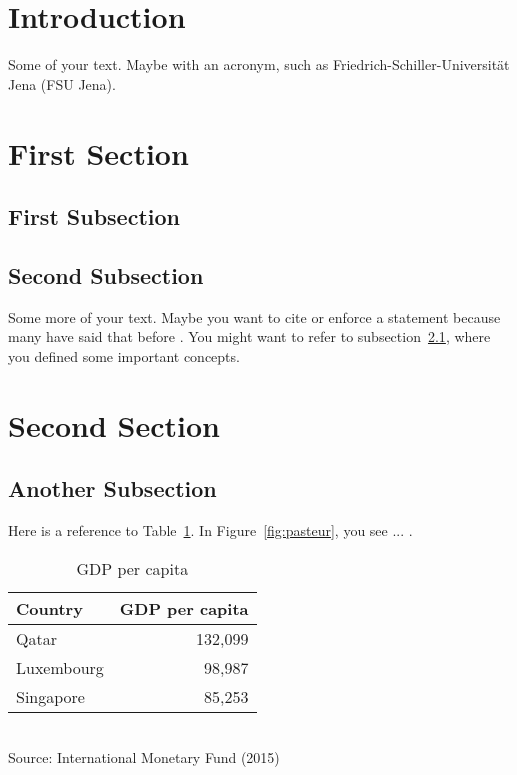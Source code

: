 \documentclass{micro-econ-thesis}
\begin{document}

\cleardoublepage
\pagestyle{headings}
\setcounter{page}{1}
\onehalfspacing %


\section{Introduction}
\label{sec:intro}

Some of your text. Maybe with an acronym, such as Friedrich-Schiller-Universität Jena (FSU Jena).

\section{First Section}
\label{sec:first}


\subsection{First Subsection}
\label{subsec:first}


\subsection{Second Subsection}
\label{subsec:second}

Some more of your text. Maybe you want to cite \textcite{Nels1959} or enforce a statement because many have said that before \parencite[e.g.][]{NeWi1982, Dosi1982, Lund1992,Acem2002}. You might want to refer to subsection~\ref{subsec:first}, where you defined some important concepts.


\section{Second Section}
\label{sec:second}

\subsection{Another Subsection}
\label{subsec:another}
Here is a reference to Table~\ref{t1:tab}. In Figure~\ref{fig:pasteur}, you see ... . 


\begin{table}[ht]
  \centering
  \caption{GDP per capita}
  \begin{tabular}{lr}
     \hline
     Country & \multicolumn{1}{c}{GDP per capita}\\ \hline 
     Qatar & 132,099 \\ 
     Luxembourg & 98,987 \\ 
     Singapore & 85,253 \\ \hline
  \end{tabular}\\
	Source: International Monetary Fund (2015) 
  \label{t1:tab}
\end{table}  
\end{document}
